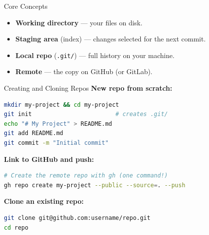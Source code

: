 \documentclass[aspectratio=169, 11pt]{beamer}
\begin{document}
\begin{frame}[fragile]{Core Concepts}
  \begin{center}
  \end{center}

  \vspace{0.3em}
  \begin{itemize}
    \item \textbf{Working directory} --- your files on disk.
    \item \textbf{Staging area} (index) --- changes selected for the next commit.
    \item \textbf{Local repo} (\texttt{.git/}) --- full history on your machine.
    \item \textbf{Remote} --- the copy on GitHub (or GitLab).
  \end{itemize}
\end{frame}

\begin{frame}[fragile]{Creating and Cloning Repos}
  \textbf{New repo from scratch:}
  \begin{lstlisting}[language=bash]
mkdir my-project && cd my-project
git init                        # creates .git/
echo "# My Project" > README.md
git add README.md
git commit -m "Initial commit"
  \end{lstlisting}

  \textbf{Link to GitHub and push:}
  \begin{lstlisting}[language=bash]
# Create the remote repo with gh (one command!)
gh repo create my-project --public --source=. --push
  \end{lstlisting}

  \textbf{Clone an existing repo:}
  \begin{lstlisting}[language=bash]
git clone git@github.com:username/repo.git
cd repo
  \end{lstlisting}
\end{frame}
\end{document}

